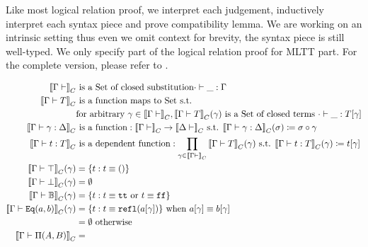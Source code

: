 Like most logical relation proof,  we interpret each judgement, inductively interpret each syntax piece and prove compatibility lemma. We are working on an intrinsic setting thus even we omit context for brevity, the syntax piece is still well-typed. We only specify part of the logical relation proof for MLTT part. For the complete version, please refer to \citet{kaposi2019gluing, coquand2018canonicity,sterling2019algebraic}.

\begin{align*}
  \denotesC{\goodCtx{\Gm}{i}} & \text{ is a Set of closed substitution} \goodSub{\cdot}{\_}{\Gm} \\
  \denotesC{\goodType{\Gm}{T}{}} & \text{ is a function maps to Set s.t.} \\
  & \text{for arbitrary } \gm \in \denotesC{\goodCtx{\Gm}{}}, \denotesC{\goodType{\Gm}{T}{}}(\gm) \text{ is a Set of closed terms } \goodTerm{\cdot}{\_}{\sub{T}{\gm}} \\ 
  \denotesC{\goodSub{\Gm}{\gm}{\Delta}} & \text{ is a function}: \denotesC{\goodCtx{\Gm}{i}} \to \denotesC{\goodCtx{\Delta}{i}} \text{ s.t. } \denotesC{\goodSub{\Gm}{\gm}{\Delta}}(\sigma) \coloneqq \SubstComp{\sigma}{\gm} \\
  \denotesC{\goodTerm{\Gm}{t}{T}} & \text{ is a dependent function}: \prod_{\gm \in \denotesC{\goodCtx{\Gm}{i}}}\denotesC{\goodType{\Gm}{T}{}}(\gm)  \text{ s.t. } \denotesC{\goodTerm{\Gm}{t}{T}}(\gm) \coloneqq \sub{t}{\gm} \\
  \denotesC{\goodType{\Gm}{\top}{}}(\gm) &= \{t : t \equiv \unit \} \\
  \denotesC{\goodType{\Gm}{\bot}{}}(\gm) &= \emptyset \\
  \denotesC{\goodType{\Gm}{\cB}{}}(\gm) &= \{t : t \equiv \true \text{ or } t \equiv\false \} \\
  \denotesC{\goodType{\Gm}{\TyId{a}{b}}{}}(\gm) &= \{t : t \equiv \eqrefl{\sub{a}{\gm}} \} \text{ when } \sub{a}{\gm} \equiv \sub{b}{\gm} \\ 
  &= \emptyset \text{ otherwise } \\ 
  \denotesC{\goodType{\Gm}{\TyPi{A}{B}}{}} &= \\

\end{align*}
